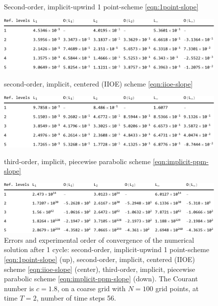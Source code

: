 \documentclass[../thesis.tex]{subfiles}
\begin{document}
\begin{figure}[H]
	\centering
    \caption*{Second-order, implicit-upwind 1 point-scheme \eqref{eqn:1point-slope}}
	\includegraphics[width=\textwidth]{../tab/tab-1point-c1p8-T2-limit0-shu.pdf}
    \caption*{second-order, implicit, centered (IIOE) scheme \eqref{eqn:iioe-slope}}
	\includegraphics[width=\textwidth]{../tab/tab-iioe-c1p8-T2-limit0-shu.pdf}
    \caption*{third-order, implicit, piecewise parabolic scheme \eqref{eqn:implicit-ppm-slope}}
	\includegraphics[width=\textwidth]{../tab/tab-implicit-ppm-c1p8-T2-limit0-shu.pdf}
	\caption{Errors and experimental order of convergence of the numerical solution after 1 cycle: second-order, implicit-upwind 1 point-scheme \eqref{eqn:1point-slope} (up), second-order, implicit, centered (IIOE) scheme \eqref{eqn:iioe-slope} (center), third-order, implicit, piecewise parabolic scheme \eqref{eqn:implicit-ppm-slope} (down). The Courant number is \(c = 1.8\), on a coarse grid with \(N = 100\) grid points, at time \(T = 2\), number of time steps 56.}
	\label{tab:c1p8-T2-limit0-shu}
\end{figure}
\end{document}
